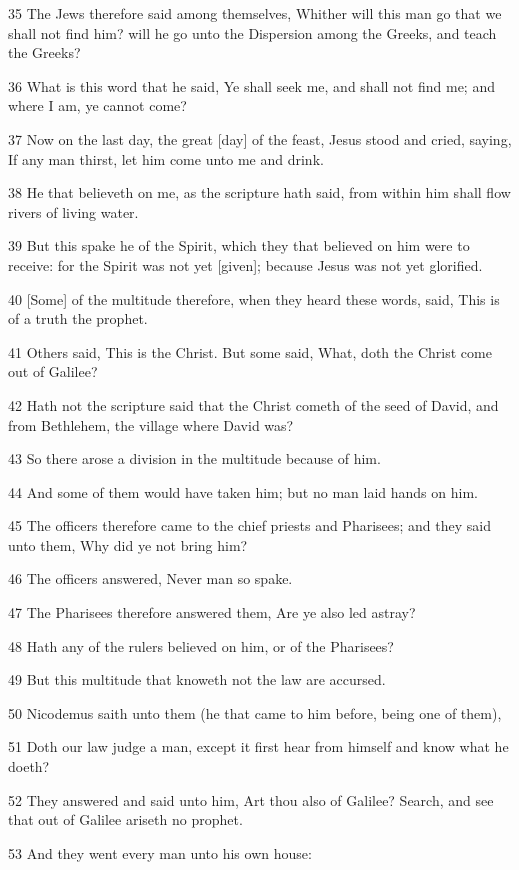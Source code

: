 \par 35 The Jews therefore said among themselves, Whither will this man go that we shall not find him? will he go unto the Dispersion among the Greeks, and teach the Greeks?
\par 36 What is this word that he said, Ye shall seek me, and shall not find me; and where I am, ye cannot come?
\par 37 Now on the last day, the great [day] of the feast, Jesus stood and cried, saying, If any man thirst, let him come unto me and drink.
\par 38 He that believeth on me, as the scripture hath said, from within him shall flow rivers of living water.
\par 39 But this spake he of the Spirit, which they that believed on him were to receive: for the Spirit was not yet [given]; because Jesus was not yet glorified.
\par 40 [Some] of the multitude therefore, when they heard these words, said, This is of a truth the prophet.
\par 41 Others said, This is the Christ. But some said, What, doth the Christ come out of Galilee?
\par 42 Hath not the scripture said that the Christ cometh of the seed of David, and from Bethlehem, the village where David was?
\par 43 So there arose a division in the multitude because of him.
\par 44 And some of them would have taken him; but no man laid hands on him.
\par 45 The officers therefore came to the chief priests and Pharisees; and they said unto them, Why did ye not bring him?
\par 46 The officers answered, Never man so spake.
\par 47 The Pharisees therefore answered them, Are ye also led astray?
\par 48 Hath any of the rulers believed on him, or of the Pharisees?
\par 49 But this multitude that knoweth not the law are accursed.
\par 50 Nicodemus saith unto them (he that came to him before, being one of them),
\par 51 Doth our law judge a man, except it first hear from himself and know what he doeth?
\par 52 They answered and said unto him, Art thou also of Galilee? Search, and see that out of Galilee ariseth no prophet.
\par 53 And they went every man unto his own house:

